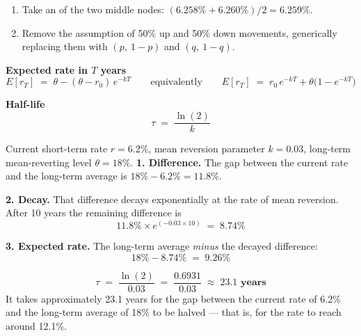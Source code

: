\begin{mrkeybox}[title={Steps to make the tree recombining}]
\begin{enumerate}
\item Take an  of the two middle nodes:
      $(6.258\% + 6.260\%) / 2 = \mathbf{6.259\%}$.
\item Remove the assumption of 50\% up and 50\% down movements, generically replacing them with
      $(p,\ 1-p)$ and $(q,\ 1-q)$.
\end{enumerate}
\end{mrkeybox}


\begin{mrfmlbox}
\textbf{Expected rate in $T$ years}
\[ E[r_T] \;=\; \theta - (\theta - r_0)\,e^{-kT}
   \qquad\text{equivalently}\qquad
   E[r_T] \;=\; r_0\,e^{-kT} + \theta\bigl(1 - e^{-kT}\bigr) \]

\medskip
\textbf{Half-life}
\[ \tau \;=\; \frac{\ln(2)}{k} \]
\end{mrfmlbox}

\begin{mrexbox}[title={Example --- expected rate in 10 years}]
Current short-term rate $r = 6.2\%$, mean reversion parameter $k = 0.03$, long-term
mean-reverting level $\theta = 18\%$.
\tcblower
\small
\textbf{1. Difference.} The gap between the current rate and the long-term average is
$18\% - 6.2\% = 11.8\%$.

\textbf{2. Decay.} That difference decays exponentially at the rate of mean reversion. After 10
years the remaining difference is
\[ 11.8\% \times e^{(-0.03 \times 10)} \;=\; \mathbf{8.74\%} \]

\textbf{3. Expected rate.} The long-term average \textit{minus} the decayed difference:
\[ 18\% - 8.74\% \;=\; \mathbf{9.26\%} \]
\end{mrexbox}

\begin{mrexbox}[title={Example continued --- half-life}]
\small
\[ \tau \;=\; \frac{\ln(2)}{0.03} \;=\; \frac{0.6931}{0.03} \;\approx\; \mathbf{23.1 \text{ years}} \]
It takes approximately 23.1 years for the gap between the current rate of 6.2\% and the
long-term average of 18\% to be halved --- that is, for the rate to reach around 12.1\%.
\end{mrexbox}


